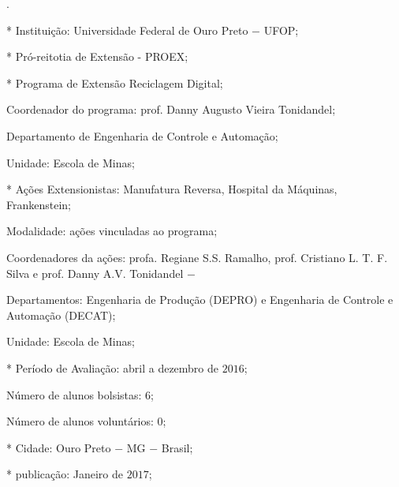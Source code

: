 \documentclass[
	12pt,				%
	openright,			%
	oneside,			%
	a4paper,			%
	english,			%
	spanish,			%
	brazil,				%
	]{abntex2}
\begin{document}

\frenchspacing 


\imprimircapa
%

\imprimirfolhaderosto*


{
\ABNTEXchapterfont

\vspace*{\fill}

\imprimirtitulo.

\begin{alineas}
  \item[*] Instituição: Universidade Federal de Ouro Preto $-$ UFOP;
  \item[*] Pró-reitotia de Extensão - PROEX; 
  \item[*] Programa de Extensão Reciclagem Digital;
  \item[] Coordenador do programa: prof. Danny Augusto Vieira Tonidandel; 
  \item[] Departamento de Engenharia de Controle e Automação;
  \item[] Unidade: Escola de Minas;
  \item[*] Ações Extensionistas: Manufatura Reversa, Hospital da Máquinas, Frankenstein;
  \item[] Modalidade: ações vinculadas ao programa;
  \item[] Coordenadores da ações: profa. Regiane S.S. Ramalho, prof. Cristiano L. T. F. Silva e prof. Danny A.V. Tonidandel $-$ 
  \item[] Departamentos: Engenharia de Produção (DEPRO) e Engenharia de Controle e Automação (DECAT);
  \item[] Unidade: Escola de Minas;
  \item[*] Período de Avaliação: abril a dezembro de $2016$;
  \item Número de alunos bolsistas: 6;
  \item Número de alunos voluntários: 0;  
  \item[*] Cidade: Ouro Preto $-$ MG $-$ Brasil;
  \item[*] publicação: Janeiro de $2017$;
\end{alineas}

\vspace*{\fill}
}
\end{document}
